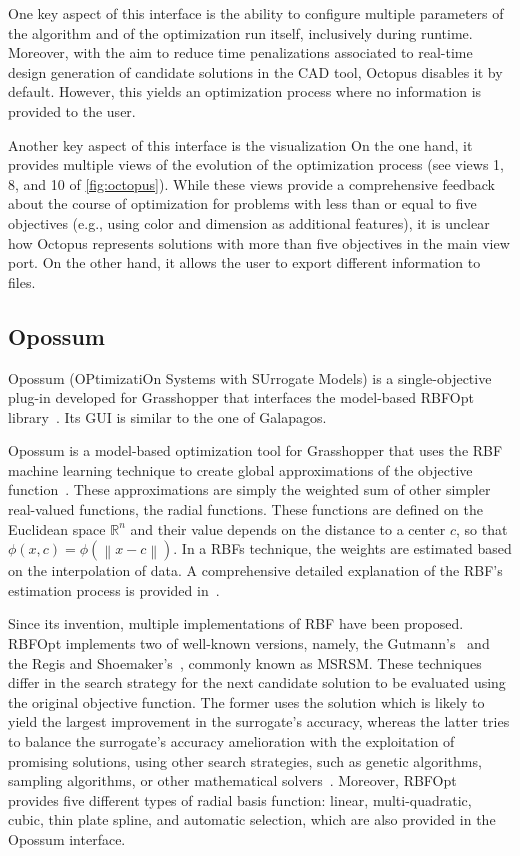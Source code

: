 One key aspect of this interface is the ability to configure multiple parameters of the algorithm and of the optimization run itself, inclusively during runtime. Moreover, with the aim to reduce time penalizations associated to real-time design generation of candidate solutions in the \ac{CAD} tool, Octopus disables it by default. However, this yields an optimization process where no information is provided to the user.

Another key aspect of this interface is the visualization On the one hand, it provides multiple views of the evolution of the optimization process (see views 1, 8, and 10 of \cref{fig:octopus}). While these views provide a comprehensive feedback about the course of optimization for problems with less than or equal to five objectives (e.g., using color and dimension as additional features), it is unclear how Octopus represents solutions with more than five objectives in the main view port. On the other hand, it allows the user to export different information to files. 

\subsection{Opossum}

Opossum (OPtimizatiOn Systems with SUrrogate Models) is a single-objective plug-in developed for Grasshopper that interfaces the model-based RBFOpt library~\cite{RBFOPT}. Its \ac{GUI} is similar to the one of Galapagos.

Opossum is a model-based optimization tool for Grasshopper that uses the \ac{RBF} machine learning technique to create global approximations of the objective function~\cite{Forrester2009SBO}. These approximations are simply the weighted sum of other simpler real-valued functions, the radial functions. These functions are defined on the Euclidean space $\mathbb{R}^n$ and their value depends on the distance to a center $c$, so that $\phi(x, c) = \phi(\left\lVert x-c \right\rVert)$. In a \acp{RBF} technique, the weights are estimated based on the interpolation of data. A comprehensive detailed explanation of the \ac{RBF}'s estimation process is provided in~\cite{Forrester2009SBO}. 

Since its invention, multiple implementations of \ac{RBF} have been proposed. RBFOpt implements two of well-known versions, namely, the Gutmann's~\cite{Gutmann2001} and the Regis and Shoemaker's~\cite{Regis2007}, commonly known as MSRSM. These techniques differ in the search strategy for the next candidate solution to be evaluated using the original objective function. The former uses the solution which is likely to yield the largest improvement in the surrogate's accuracy, whereas the latter tries to balance the surrogate's accuracy amelioration with the exploitation of promising solutions, using other search strategies, such as genetic algorithms, sampling algorithms, or other mathematical solvers~\cite{Wortmann2017Opossum}. Moreover, RBFOpt provides five different types of radial basis function: linear, multi-quadratic, cubic, thin plate spline, and automatic selection, which are also provided in the Opossum interface.

